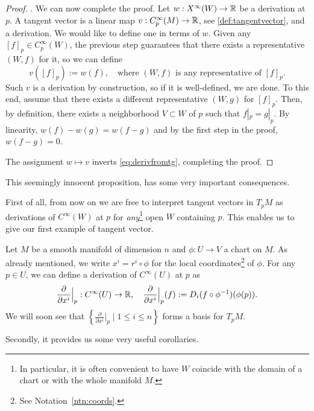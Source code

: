 \begin{proof}
  . We can now complete the proof.
  Let $w:X^\infty(W) \to\mathbb{R}$ be a derivation at $p$.
  A tangent vector is a linear map $v:C_p^\infty(M)\to\mathbb{R}$, see \eqref{def:tangentvector}, and a derivation.
  We would like to define one in terms of $w$.
  Given any $[f]_p\in C_p^\infty(W)$, the previous step guarantees that there exists a representative $(W,f)$ for it, so we can define
  \begin{equation}
    v([f]_p) := w(f), \quad\mbox{where $(W,f)$ is any representative of $[f]_p$}.
  \end{equation}
  Such $v$ is a derivation by construction, so if it is well-defined, we are done.
  To this end, assume that there exists a different representative $(W, g)$ for $[f]_p$.
  Then, by definition, there exists a neighborhood $V\subset W$ of $p$ such that $f|_p = g|_p$.
  By linearity, $w(f) - w(g) = w(f-g)$ and by the first step in the proof, $w(f-g) = 0$.
  
  The assignment $w\mapsto v$ inverts \eqref{eq:derivfromtg}, completing the proof.
\end{proof}

This seemingly innocent proposition, has some very important consequences.

First of all, from now on we are free to interpret tangent vectors in $T_p M$ as derivations of $C^\infty(W)$ at $p$ for \emph{any}\footnote{In particular, it is often convenient to have $W$ coincide with the domain of a chart or with the whole manifold $M$.} open $W$ containing $p$.
This enables us to give our first example of tangent vector.

\begin{example}\label{ex:partialderivative}
  Let $M$ be a smooth manifold of dimension $n$ and $\phi: U \to V$ a chart on $M$.
  As already mentioned, we write $x^i = r^i \circ \phi$ for the local coordinates\footnote{See Notation~\ref{ntn:coords}.} of $\phi$.
  For any $p\in U$, we can define a derivation of $C^\infty(U)$ at $p$ as
  \begin{equation}
    \frac{\partial}{\partial x^i}\Big|_p : C^\infty(U) \to \mathbb{R}, \quad
    \frac{\partial}{\partial x^i}\Big|_p (f) := D_i(f\circ\phi^{-1})(\phi(p)).
  \end{equation}
  We will soon see that $\left\{\frac{\partial}{\partial x^i}\Big|_p \mid 1\leq i\leq n\right\}$ forms a basis for $T_p M$.
\end{example}

Secondly, it provides us some very useful corollaries.

